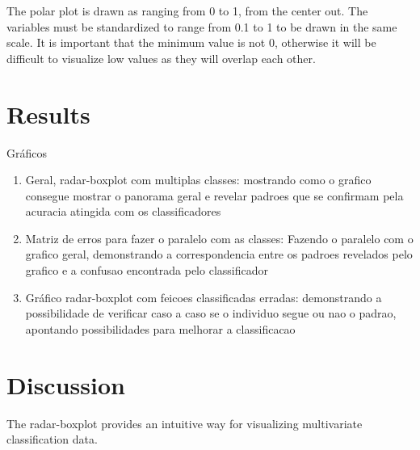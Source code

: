 \documentclass[12pt]{article}
\begin{document}
The polar plot is drawn as ranging from 0 to 1, from the center out. The variables must be standardized to range from 0.1 to 1 to be drawn in the same scale. It is important that the minimum value is not 0, otherwise it will be difficult to visualize low values as they will overlap each other.

\section{Results}
\label{sec:results}
Gráficos
\begin{enumerate}
  \item Geral, radar-boxplot com multiplas classes: mostrando como o grafico consegue mostrar o panorama geral e revelar padroes que se confirmam pela acuracia atingida com os classificadores
  \item Matriz de erros para fazer o paralelo com as classes: Fazendo o paralelo com o grafico geral, demonstrando a correspondencia entre os padroes revelados pelo grafico e a confusao encontrada pelo classificador
  \item Gráfico radar-boxplot com feicoes classificadas erradas: demonstrando a possibilidade de verificar caso a caso se o individuo segue ou nao o padrao, apontando possibilidades para melhorar a classificacao
\end{enumerate}


\section{Discussion}
\label{sec:conc}
\bigskip
The radar-boxplot provides an intuitive way for visualizing multivariate classification data. 




\end{document}
